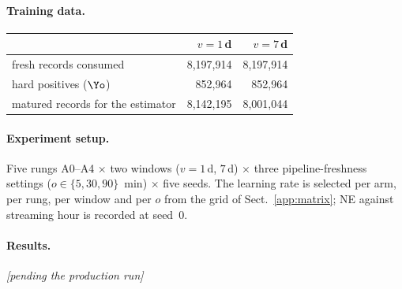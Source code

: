 \paragraph{Training data.}
\begin{center}\small\begin{tabular}{lrr}
\toprule
 & $v=1$\,d & $v=7$\,d\\
\midrule
fresh records consumed & 8{,}197{,}914 & 8{,}197{,}914\\
hard positives ($\Yo$) & 852{,}964 & 852{,}964\\
matured records for the estimator & 8{,}142{,}195 & 8{,}001{,}044\\
\bottomrule
\end{tabular}\end{center}

\paragraph{Experiment setup.} Five rungs A0--A4 $\times$ two windows ($v=1$\,d, $7$\,d) $\times$ three pipeline-freshness settings ($o \in \{5, 30, 90\}$~min) $\times$ five seeds. The learning rate is selected per arm, per rung, per window and per $o$ from the grid of Sect.~\ref{app:matrix}; NE against streaming hour is recorded at seed~0.

\paragraph{Results.} \emph{[pending the production run]}

